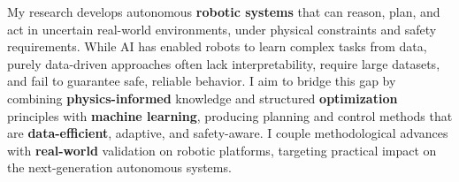 %
My research develops autonomous \textbf{robotic systems} that can reason, plan, and act in uncertain real-world environments, under physical constraints and safety requirements. While AI has enabled robots to learn complex tasks from data, purely data-driven approaches often lack interpretability, require large datasets, and fail to guarantee safe, reliable behavior. I aim to bridge this gap by combining \textbf{physics-informed} knowledge and structured \textbf{optimization} principles with \textbf{machine learning}, producing planning and control methods that are \textbf{data-efficient}, adaptive, and safety-aware. I couple methodological advances with \textbf{real-world} validation on robotic platforms, targeting practical impact on the next-generation autonomous systems.
%
%

\vspace{0.4cm}

